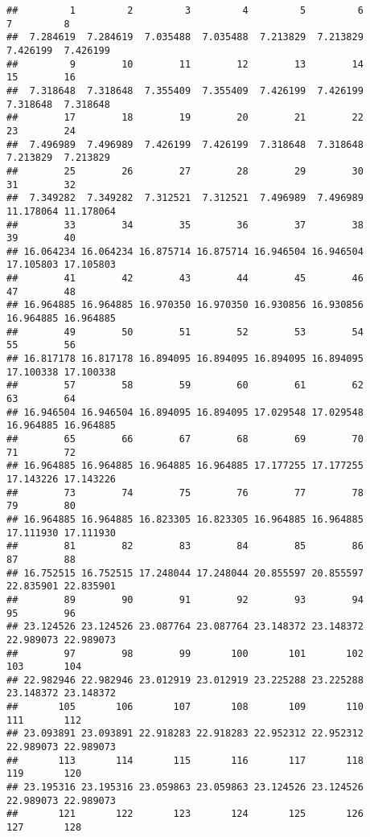 \documentclass[
]{article}
\begin{document}
\begin{verbatim}
##         1         2         3         4         5         6         7         8 
##  7.284619  7.284619  7.035488  7.035488  7.213829  7.213829  7.426199  7.426199 
##         9        10        11        12        13        14        15        16 
##  7.318648  7.318648  7.355409  7.355409  7.426199  7.426199  7.318648  7.318648 
##        17        18        19        20        21        22        23        24 
##  7.496989  7.496989  7.426199  7.426199  7.318648  7.318648  7.213829  7.213829 
##        25        26        27        28        29        30        31        32 
##  7.349282  7.349282  7.312521  7.312521  7.496989  7.496989 11.178064 11.178064 
##        33        34        35        36        37        38        39        40 
## 16.064234 16.064234 16.875714 16.875714 16.946504 16.946504 17.105803 17.105803 
##        41        42        43        44        45        46        47        48 
## 16.964885 16.964885 16.970350 16.970350 16.930856 16.930856 16.964885 16.964885 
##        49        50        51        52        53        54        55        56 
## 16.817178 16.817178 16.894095 16.894095 16.894095 16.894095 17.100338 17.100338 
##        57        58        59        60        61        62        63        64 
## 16.946504 16.946504 16.894095 16.894095 17.029548 17.029548 16.964885 16.964885 
##        65        66        67        68        69        70        71        72 
## 16.964885 16.964885 16.964885 16.964885 17.177255 17.177255 17.143226 17.143226 
##        73        74        75        76        77        78        79        80 
## 16.964885 16.964885 16.823305 16.823305 16.964885 16.964885 17.111930 17.111930 
##        81        82        83        84        85        86        87        88 
## 16.752515 16.752515 17.248044 17.248044 20.855597 20.855597 22.835901 22.835901 
##        89        90        91        92        93        94        95        96 
## 23.124526 23.124526 23.087764 23.087764 23.148372 23.148372 22.989073 22.989073 
##        97        98        99       100       101       102       103       104 
## 22.982946 22.982946 23.012919 23.012919 23.225288 23.225288 23.148372 23.148372 
##       105       106       107       108       109       110       111       112 
## 23.093891 23.093891 22.918283 22.918283 22.952312 22.952312 22.989073 22.989073 
##       113       114       115       116       117       118       119       120 
## 23.195316 23.195316 23.059863 23.059863 23.124526 23.124526 22.989073 22.989073 
##       121       122       123       124       125       126       127       128 

\end{verbatim}
\end{document}
